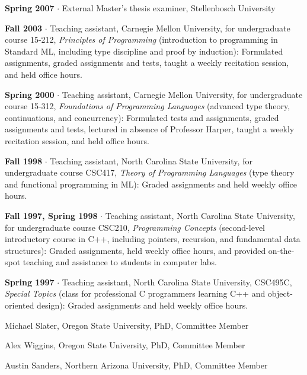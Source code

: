 \documentclass[ComputerScience]{vita}
\begin{document}
\begin{vita}
\begin{Teaching}
  \item  {\bf Spring 2007} $\cdot$ External Master's thesis examiner, Stellenbosch University

   \item {\bf Fall 2003} $\cdot$ Teaching assistant, Carnegie Mellon
   University, for undergraduate course 15-212, \emph{Principles of
   Programming} (introduction to programming in Standard ML, including type
   discipline and proof by induction): Formulated assignments, graded
   assignments and tests, taught a weekly recitation session, and held
   office hours.

   \item {\bf Spring 2000} $\cdot$ Teaching assistant, Carnegie Mellon
   University, for undergraduate course 15-312, \emph{Foundations of
   Programming Languages} (advanced type theory, continuations, and concurrency): Formulated tests and assignments, graded
   assignments and tests, lectured in absence of Professor Harper,
   taught a weekly recitation session, and held office hours.

   \item {\bf Fall 1998} $\cdot$ Teaching assistant, North Carolina
   State University, for undergraduate course CSC417, \emph{Theory of
   Programming Languages} (type theory and functional programming in ML):
   Graded assignments and held weekly office hours.

   \item {\bf Fall 1997, Spring 1998} $\cdot$ Teaching assistant,
   North Carolina State University, for undergraduate course CSC210,
   {\em Programming Concepts} (second-level introductory course in
   C++, including pointers, recursion, and fundamental data
   structures): Graded assignments, held weekly office hours, and
   provided on-the-spot teaching and assistance to students in
   computer labs.

   \item {\bf Spring 1997} $\cdot$ Teaching assistant, North
   Carolina State University, CSC495C, {\em
   Special Topics} (class for professional C programmers learning C++ and object-oriented design):  Graded assignments and held weekly office
   hours.

\end{Teaching}

\begin{Current Students}
\item Michael Slater, Oregon State University, PhD, Committee Member
\item Alex Wiggins, Oregon State University, PhD, Committee Member
\item Austin Sanders, Northern Arizona University, PhD, Committee Member
\end{Current Students}


\end{vita}
\end{document}
